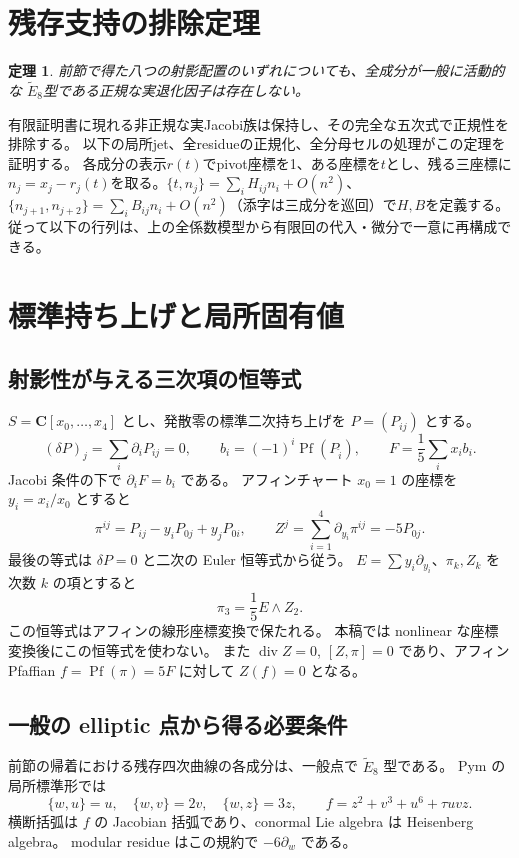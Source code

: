 \documentclass[11pt,a4paper]{ltjsarticle}
\newcommand{\CC}{\mathbf C}\newcommand{\QQ}{\mathbf Q}
\DeclareMathOperator{\Pf}{Pf}\DeclareMathOperator{\length}{length}
\newtheorem{theorem}{定理}[section]
\theoremstyle{remark}\newtheorem{remark}[theorem]{注意}
\begin{document}
\section{残存支持の排除定理}\label{sec:eight-exclusion}
\begin{theorem}\label{thm:eight-exclusion}
前節で得た八つの射影配置のいずれについても、全成分が一般に活動的な
$\widetilde E_8$型である正規な実退化因子は存在しない。
\end{theorem}
有限証明書に現れる非正規な実Jacobi族は保持し、その完全な五次式で正規性を排除する。
以下の局所jet、全residueの正規化、全分母セルの処理がこの定理を証明する。
各成分の表示$r(t)$でpivot座標を1、ある座標を$t$とし、残る三座標に
$n_j=x_j-r_j(t)$を取る。$\{t,n_j\}=\sum_iH_{ij}n_i+O(n^2)$、
$\{n_{j+1},n_{j+2}\}=\sum_iB_{ij}n_i+O(n^2)$（添字は三成分を巡回）で$H,B$を定義する。
従って以下の行列は、上の全係数模型から有限回の代入・微分で一意に再構成できる。


\section{標準持ち上げと局所固有値}

\subsection{射影性が与える三次項の恒等式}
$S=\CC[x_0,\ldots,x_4]$ とし、発散零の標準二次持ち上げを $P=(P_{ij})$ とする。
\[
 (\delta P)_j=\sum_i\partial_iP_{ij}=0,\qquad
 b_i=(-1)^i\Pf(P_{\widehat i}),\qquad
 F=\frac15\sum_i x_i b_i.
\]
Jacobi 条件の下で $\partial_iF=b_i$ である。
アフィンチャート $x_0=1$ の座標を $y_i=x_i/x_0$ とすると
\[
 \pi^{ij}=P_{ij}-y_iP_{0j}+y_jP_{0i},\qquad
 Z^j=\sum_{i=1}^4\partial_{y_i}\pi^{ij}=-5P_{0j}.
\]
最後の等式は $\delta P=0$ と二次の Euler 恒等式から従う。
$E=\sum y_i\partial_{y_i}$、$\pi_k,Z_k$ を次数 $k$ の項とすると
\begin{equation}\label{eq:radial-cubic}
 \boxed{\pi_3=\frac15E\wedge Z_2.}
\end{equation}
この恒等式はアフィンの線形座標変換で保たれる。
本稿では nonlinear な座標変換後にこの恒等式を使わない。
また $\operatorname{div}Z=0$, $[Z,\pi]=0$ であり、アフィン Pfaffian $f=\Pf(\pi)=5F$
に対して $Z(f)=0$ となる。

\subsection{一般の elliptic 点から得る必要条件}
前節の帰着における残存四次曲線の各成分は、一般点で $\widetilde E_8$ 型である。
Pym の局所標準形\cite[Theorem 4.5, Table 1]{PymElliptic}では
\[
 \{w,u\}=u,\quad\{w,v\}=2v,\quad\{w,z\}=3z,
 \qquad f=z^2+v^3+u^6+\tau uvz.
\]
横断括弧は $f$ の Jacobian 括弧であり、conormal Lie algebra は Heisenberg algebra。
modular residue はこの規約で $-6\partial_w$ である。
\end{document}
